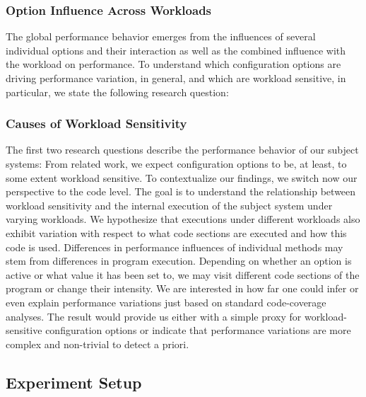 {
\subsubsection{Option Influence Across Workloads}
The global performance behavior emerges from the influences of several individual options and their interaction as well as the combined influence with the workload on performance. To understand which configuration options are driving performance variation, in general, and which are workload sensitive, in particular, we state the following research question:


\subsubsection{Causes of Workload Sensitivity}
The first two research questions describe the performance behavior of our subject systems: From related work, we expect configuration options to be, at least, to some extent workload sensitive. To contextualize our findings, we switch now our perspective to the code level. The goal is to understand the relationship between workload sensitivity and the internal execution of the subject system under varying workloads. We hypothesize that executions under different workloads also exhibit variation with respect to what code sections are executed and how this code is used. 
Differences in performance influences of individual methods may stem from differences in program execution. Depending on whether an option is active or what value it has been set to, we may visit different code sections of the program or change their intensity. We are interested in how far one could infer or even explain performance variations just based on standard code-coverage analyses. The result would provide us either with a simple proxy for workload-sensitive configuration options or indicate that performance variations are more complex and non-trivial to detect a priori.


\subsection{Experiment Setup}\label{sec:setup}
}
